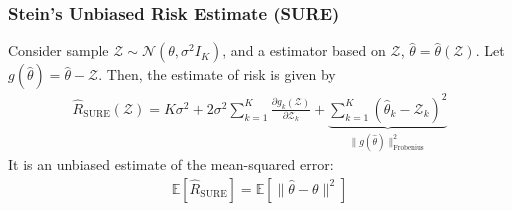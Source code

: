 \documentclass[11pt]{elegantbook}
\begin{document}
\subsubsection{Stein's Unbiased Risk Estimate (SURE)}
Consider sample $\mathcal{Z}\sim \mathcal{N}(\theta,\sigma^2 I_K)$, and a estimator based on $\mathcal{Z}$, $\hat{\theta}=\hat{\theta}(\mathcal{Z})$. Let $g(\hat{\theta})=\hat{\theta}-\mathcal{Z}$. Then, the estimate of risk is given by
\begin{equation}
    \begin{aligned}
        \hat{R}_\text{SURE}(\mathcal{Z})=K\sigma^2+2\sigma^2\sum_{k=1}^K \frac{\partial g_k(\mathcal{Z})}{\partial \mathcal{Z}_k}+\underbrace{\sum_{k=1}^K\left(\hat{\theta}_k- \mathcal{Z}_k\right)^2}_{\|g(\hat{\theta})\|_\text{Frobenius}^2}
    \end{aligned}
    \nonumber
\end{equation}
It is an unbiased estimate of the mean-squared error:
\begin{equation}
    \begin{aligned}
        \mathbb{E}[\hat{R}_\text{SURE}]=\mathbb{E}[\|\hat{\theta}-\theta\|^2]
    \end{aligned}
    \nonumber
\end{equation}
\end{document}
